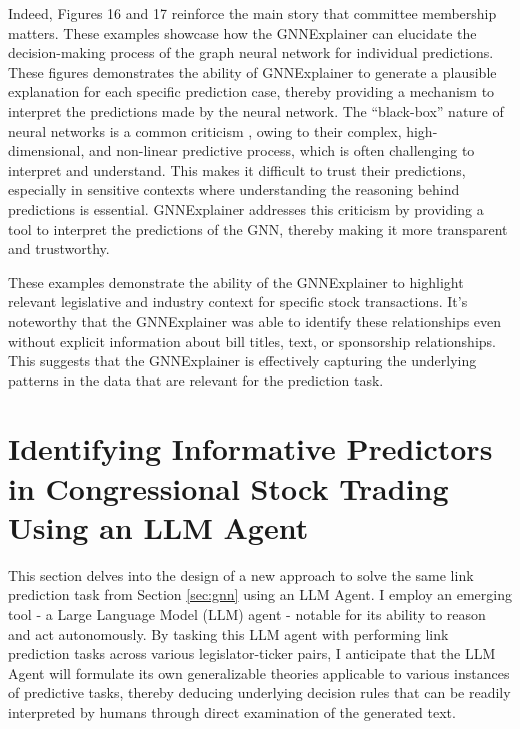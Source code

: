 \documentclass[15pt,letterpaper]{article}
\begin{document}
Indeed, Figures 16 and 17 reinforce the main story that committee membership matters. These examples showcase how the GNNExplainer can elucidate the decision-making process of the graph neural network for individual predictions. These figures demonstrates the ability of GNNExplainer to generate a plausible explanation for each specific prediction case, thereby providing a mechanism to interpret the predictions made by the neural network.
The ``black-box'' nature of neural networks is a common criticism \citep{bb4, bb5, bb6}, owing to their complex, high-dimensional, and non-linear predictive process, which is often challenging to interpret and understand. This makes it difficult to trust their predictions, especially in sensitive contexts where understanding the reasoning behind predictions is essential. GNNExplainer addresses this criticism by providing a tool to interpret the predictions of the GNN, thereby making it more transparent and trustworthy.




These examples demonstrate the ability of the GNNExplainer to highlight relevant legislative and industry context for specific stock transactions. It's noteworthy that the GNNExplainer was able to identify these relationships even without explicit information about bill titles, text, or sponsorship relationships. This suggests that the GNNExplainer is effectively capturing the underlying patterns in the data that are relevant for the prediction task.



\section{Identifying Informative Predictors in Congressional Stock Trading Using an LLM Agent}

This section delves into the design of a new approach to solve the same link prediction task from Section \ref{sec:gnn} using an LLM Agent.
I employ an emerging tool - a Large Language Model (LLM) agent \citep{park2022social,shinn2023reflexion,wang2023voyager} - notable for its ability to reason and act autonomously. 
By tasking this LLM agent with performing link prediction tasks across various legislator-ticker pairs, 
I anticipate that the LLM Agent will formulate its own generalizable theories applicable to various instances of predictive tasks, thereby deducing underlying decision rules that can be readily interpreted by humans through direct examination of the generated text.
\end{document}
